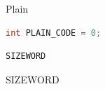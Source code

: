 \documentclass[aspectratio=169,10pt]{beamer}
\begin{document}
\begin{frame}[fragile]{Plain}
	\begin{lstlisting}[language=C++]
int PLAIN_CODE = 0;
	\end{lstlisting}
	
	\begin{lstlisting}
SIZEWORD
	\end{lstlisting}
	{\scriptsize SIZEWORD}
\end{frame}
\end{document}

